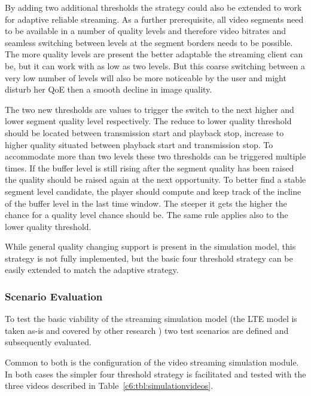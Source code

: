 By adding two additional thresholds the strategy could also be extended to work for adaptive reliable streaming. As a further prerequisite, all video segments need to be available in a number of quality levels and therefore video bitrates and seamless switching between levels at the segment borders needs to be possible. The more quality levels are present the better adaptable the streaming client can be, but it can work with as low as two levels. But this coarse switching between a very low number of levels will also be more noticeable by the user and might disturb her \gls{QoE} then a smooth decline in image quality.

The two new thresholds are values to trigger the switch to the next higher and lower segment quality level respectively. The reduce to lower quality threshold should be located between transmission start and playback stop, increase to higher quality situated between playback start and transmission stop. To accommodate more than two levels these two thresholds can be triggered multiple times. If the buffer level is still rising after the segment quality has been raised the quality should be raised again at the next opportunity. To better find a stable segment level candidate, the player should compute and keep track of the incline of the buffer level in the last time window. The steeper it gets the higher the chance for a quality level chance should be. The same rule applies also to the lower quality threshold.

While general quality changing support is present in the simulation model, this strategy is not fully implemented, but the basic four threshold strategy can be easily extended to match the adaptive strategy.


\subsubsection{Scenario Evaluation}

To test the basic viability of the streaming simulation model (the \gls{LTE} model is taken as-is and covered by other research \cite{Baldo:2013:OSM:2507924.2507940}) two test scenarios are defined and subsequently evaluated.

Common to both is the configuration of the video streaming simulation module. In both cases the simpler four threshold strategy is facilitated and tested with the three videos described in Table~\ref{c6:tbl:simulationvideos}.

